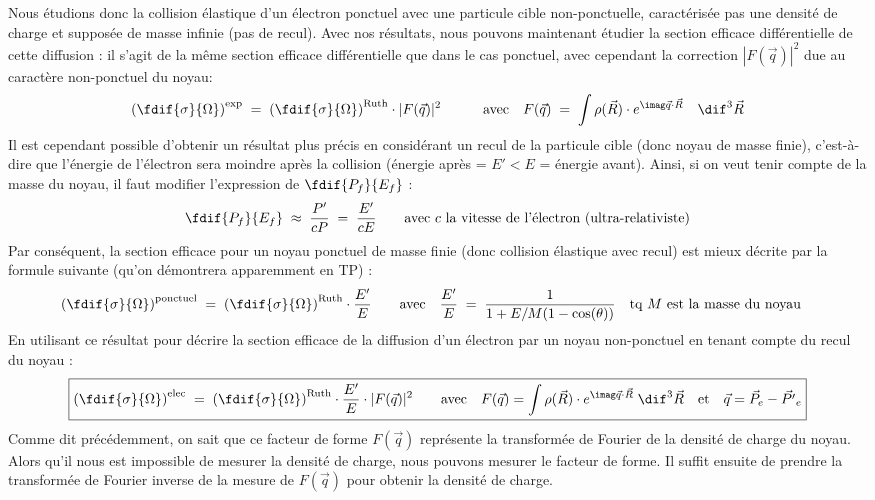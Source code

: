 Nous étudions donc la collision élastique d'un électron ponctuel avec une particule cible non-ponctuelle, caractérisée pas une densité de charge et supposée de masse infinie (pas de recul). Avec nos résultats, nous pouvons maintenant étudier la section efficace différentielle de cette diffusion : il s'agit de la même section efficace différentielle que dans le cas ponctuel, avec cependant la correction $|F(\vec{q})|^2$ due au caractère non-ponctuel du noyau:
\[
    \left( \fdif{\sigma}{\Omega} \right)^\text{exp}
    \eq
    \left( \fdif{\sigma}{\Omega} \right)^\text{Ruth}
    \cdot |F(\vec{q})|^2
    \qquad \quad \text{avec} \quad
    F(\vec{q}) \eq \int 
    \rho(\vec{R}) \cdot e^{\imag\vec{q} \cdot\vec{R}}
    \quad \dif^3\vec{R}
\]
Il est cependant possible d'obtenir un résultat plus précis en considérant un recul de la particule cible (donc noyau de masse finie), c'est-à-dire que l'énergie de l'électron sera moindre après la collision (énergie après = $E'<E$ = énergie avant). Ainsi, si on veut tenir compte de la masse du noyau, il faut modifier l'expression de $\fdif{P_f}{E_f}$ :
\[
    \fdif{P_f}{E_f} \;\approx\; \dfrac{P'}{cP} \eq \dfrac{E'}{cE}
    \qquad \text{avec $c$ la vitesse de l'électron (ultra-relativiste)}
\]
Par conséquent, la section efficace pour un noyau ponctuel de masse finie (donc collision élastique avec recul) est mieux décrite par la formule suivante (qu'on démontrera apparemment en TP) :
\[
    \left( \fdif{\sigma}{\Omega} \right)^\text{ponctuel}
    \eq
    \left( \fdif{\sigma}{\Omega} \right)^\text{Ruth}
    \cdot \dfrac{E'}{E}
    \qquad \text{avec} \quad
    \dfrac{E'}{E} \eq
    \dfrac{1}{1+E/M(1-\cos(\theta))} 
    \quad \text{tq $M$ est la masse du noyau} \quad 
\]
En utilisant ce résultat pour décrire la section efficace de la diffusion d'un électron par un noyau non-ponctuel en tenant compte du recul du noyau :
\[
\boxed{
    \left( \fdif{\sigma}{\Omega} \right)^\text{elec}
    \eq
    \left( \fdif{\sigma}{\Omega} \right)^\text{Ruth}
    \cdot \dfrac{E'}{E}
    \cdot |F(\vec{q})|^2
    \qquad \text{avec} \quad 
     F(\vec{q}) = \int 
    \rho(\vec{R}) \cdot e^{\imag\vec{q} \cdot\vec{R}}
    \; \dif^3\vec{R}
    \quad \text{et} \quad
    \vec{q} = \vec{P}_e - \vec{P'}_e
}
\]
Comme dit précédemment, on sait que ce facteur de forme $F(\vec{q})$ représente la transformée de Fourier de la densité de charge du noyau. Alors qu'il nous est impossible de mesurer la densité de charge, nous pouvons mesurer le facteur de forme. Il suffit ensuite de prendre la transformée de Fourier inverse de la mesure de $F(\vec{q})$ pour obtenir la densité de charge.\\
